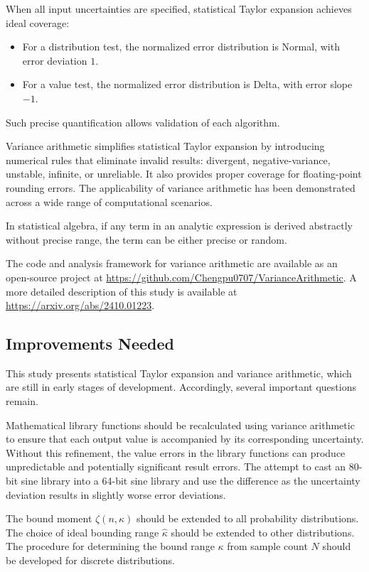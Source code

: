 \documentclass[twoside]{article}
\numberwithin{equation}{section}
\begin{document}
When all input uncertainties are specified, statistical Taylor expansion achieves ideal coverage:
\begin{itemize}
\item For a distribution test, the normalized error distribution is Normal, with error deviation $1$.
\item For a value test, the normalized error distribution is Delta, with error slope $-1$.
\end{itemize}
Such precise quantification allows validation of each algorithm.

Variance arithmetic simplifies statistical Taylor expansion by introducing numerical rules that eliminate invalid results: divergent, negative-variance, unstable, infinite, or unreliable.
It also provides proper coverage for floating-point rounding errors.
The applicability of variance arithmetic has been demonstrated across a wide range of computational scenarios.

In statistical algebra, if any term in an analytic expression is derived abstractly without precise range, the term can be either precise or random.

The code and analysis framework for variance arithmetic are available as an open-source project at \url{https://github.com/Chengpu0707/VarianceArithmetic}.
A more detailed description of this study is available at \url{https://arxiv.org/abs/2410.01223}.



\subsection{Improvements Needed}

This study presents statistical Taylor expansion and variance arithmetic, which are still in early stages of development.
Accordingly, several important questions remain.

Mathematical library functions should be recalculated using variance arithmetic to ensure that each output value is accompanied by its corresponding uncertainty.
Without this refinement, the value errors in the library functions can produce unpredictable and potentially significant result errors.
The attempt to cast an 80-bit sine library into a 64-bit sine library and use the difference as the uncertainty deviation results in slightly worse error deviations.

The bound moment $\zeta(n, \kappa)$ should be extended to all probability distributions.
The choice of ideal bounding range $\hat{\kappa}$ should be extended to other distributions.
The procedure for determining the bound range $\kappa$ from sample count $N$ should be developed for discrete distributions.
\end{document}
